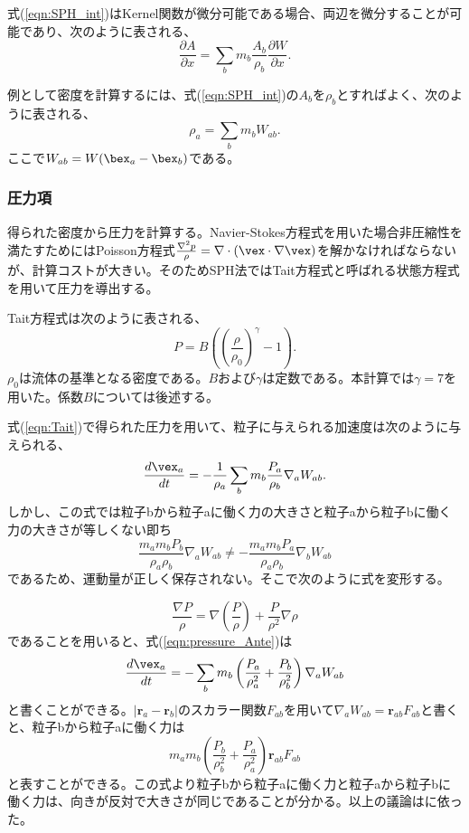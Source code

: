 \documentclass[]{jsarticle}
\begin{document}
式(\ref{eqn:SPH_int})はKernel関数が微分可能である場合、両辺を微分することが可能であり、次のように表される、
\begin{equation}
\frac{\partial A}{\partial x}=\sum_bm_b\frac{A_b}{\rho_b}\frac{\partial W}{\partial x}.
\end{equation}

例として密度を計算するには、式(\ref{eqn:SPH_int})の$A_b$を$\rho_b$とすればよく、次のように表される、
\begin{equation}
\rho_{a}=\sum_bm_bW_{ab}.
\end{equation}
ここで$W_{ab}=W(\bex_a-\bex_b)$である。

\subsubsection{圧力項}
得られた密度から圧力を計算する。Navier-Stokes方程式を用いた場合非圧縮性を満たすためにはPoisson方程式$\frac{\nabla^2p}{\rho}=\nabla\cdot(\vex\cdot\nabla\vex)$を解かなければならないが、計算コストが大きい。そのためSPH法ではTait方程式と呼ばれる状態方程式を用いて圧力を導出する。

Tait方程式は次のように表される、
\begin{equation}
  \label{eqn:Tait}
  P=B\left(
 \left(\frac{\rho}{\rho_0}\right)^\gamma-1
    \right).
\end{equation}
$\rho_0$は流体の基準となる密度である。$B$および$\gamma$は定数である。本計算では$\gamma=7$を用いた。係数$B$については後述する。

式(\ref{eqn:Tait})で得られた圧力を用いて、粒子に与えられる加速度は次のように与えられる、
\begin{equation}
  \label{eqn:pressure_Ante}
\frac{d\vex_a}{dt}=-\frac{1}{\rho_a}\sum_bm_b\frac{P_a}{\rho_b}\nabla_aW_{ab}.
\end{equation}
しかし、この式では粒子bから粒子aに働く力の大きさと粒子aから粒子bに働く力の大きさが等しくない即ち
\begin{equation}
\frac{m_am_bP_b}{\rho_a\rho_b}\nabla_aW_{ab} \neq -\frac{m_am_bP_a}{\rho_a\rho_b}\nabla_bW_{ab}
\end{equation}
であるため、運動量が正しく保存されない。そこで次のように式を変形する。

\begin{equation}
\frac{\nabla P}{\rho}=\nabla \left(\frac{P}{\rho}\right)+\frac{P}{\rho^2}\nabla \rho
\end{equation}
であることを用いると、式(\ref{eqn:pressure_Ante})は
\begin{equation}
\frac{d\vex_a}{dt}=-\sum_bm_b\left(\frac{P_a}{\rho_a^2}+\frac{P_b}{\rho_b^2}\right)\nabla_aW_{ab}
\end{equation}
と書くことができる。$|\bm{r}_a-\bm{r}_b|$のスカラー関数$F_{ab}$を用いて$\nabla_aW_{ab}=\bm{r}_{ab}F_{ab}$と書くと、粒子bから粒子aに働く力は
\begin{equation}
m_am_b\left(\frac{P_b}{\rho_b^2}+\frac{P_a}{\rho_a^2}\right)\bm{r}_{ab}F_{ab}
\end{equation}
と表すことができる。この式より粒子bから粒子aに働く力と粒子aから粒子bに働く力は、向きが反対で大きさが同じであることが分かる。以上の議論は\cite{Monaghan2005}に依った。
\end{document}
